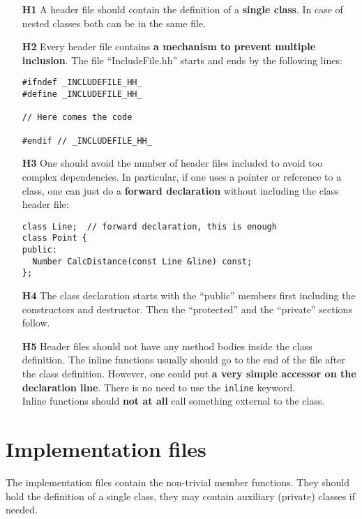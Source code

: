 \documentclass[a4paper,10pt]{article}
\begin{document}
\begin{itemize}
\item[\bf H1] A header file should contain the definition of a {\bf single
    class}. In case of nested classes both can be in the same file.
\item[\bf H2] Every header file contains {\bf a mechanism to prevent multiple
    inclusion}. The file ``IncludeFile.hh'' starts and ends by the
    following lines:%
    \begin{verbatim}
#ifndef _INCLUDEFILE_HH_
#define _INCLUDEFILE_HH_

// Here comes the code

#endif // _INCLUDEFILE_HH_
    \end{verbatim}
\item[\bf H3] One should avoid the number of header files included to avoid
  too complex dependencies. In particular, if one uses a pointer or reference
  to a class, one can just do a {\bf forward declaration} without including
  the class header file:
  \begin{verbatim}
class Line;  // forward declaration, this is enough
class Point {
public:
  Number CalcDistance(const Line &line) const;
};
  \end{verbatim}
\item[\bf H4] The class declaration starts with the ``public'' members
  first including the constructors and destructor. Then the ``protected''
  and the ``private'' sections follow.
\item[\bf H5] Header files should not have any method bodies inside the
  class definition. 
  The inline functions usually should go to
  the end of the file after the class definition. However, one could put
  {\bf a very simple accessor on the declaration line}. There is no need to 
  use the {\tt inline} keyword.\\
  Inline functions should {\bf not at all} call something external to the
  class.
\end{itemize}

\section{Implementation files}

The implementation files contain the non-trivial member functions. They
should hold the definition of a single class, they may contain auxiliary
(private) classes if needed.
\end{document}
